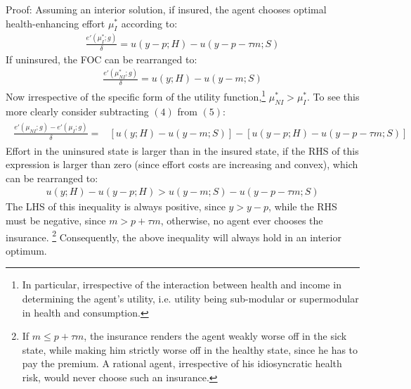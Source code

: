 Proof: Assuming an interior solution, if insured, the agent chooses optimal health-enhancing effort $\mu_I^{*}$ according to:
\begin{align*}
	\frac{ e'(\mu_I^{*};g)}{\delta}= u(y-p;H)-u(y-p-\tau m;S)
\end{align*}
If uninsured, the FOC can be rearranged to:
\begin{align*}
	\frac{e'(\mu_{NI}^{*};g)}{\delta}= u(y;H)-u(y-m;S)
\end{align*}
Now irrespective of the specific form of the utility function,\footnote{In particular, irrespective of the interaction between health and income in determining the agent's utility, i.e. utility being sub-modular or supermodular in health and consumption.} $\mu_{NI}^{*}>\mu_I^{*}$. To see this more clearly consider subtracting $(4)$ from $(5)$:
\begin{align}
\begin{aligned}
	\frac{e'(\mu_{NI};g)-e'(\mu_I;g)}{\delta}=&\left[ u(y;H)-u(y-m;S)\right]-\left[ u(y-p;H)-u(y-p-\tau m;S)\right]
\end{aligned}
	 \label{eq:proof1a}
\end{align}
Effort in the uninsured state is larger than in the insured state, if the RHS of this expression is larger than zero (since effort costs are increasing and convex), which can be rearranged to:
\begin{align}
	 u(y;H)-u(y-p;H) > u(y-m;S)-u(y-p-\tau m;S)
	 \label{eq:proof1b}
\end{align}
The LHS of this inequality is always positive, since $y>y-p$, while the RHS must be negative, since $m> p+\tau m$, otherwise, no agent ever chooses the insurance.%
\footnote{If $m\leq p+\tau m$, the insurance renders the agent weakly worse off in the sick state, while making him strictly worse off in the healthy state, since he has to pay the premium.
A rational agent, irrespective of his idiosyncratic health risk, would never choose such an insurance.}
Consequently, the above inequality will always hold in an interior optimum.


